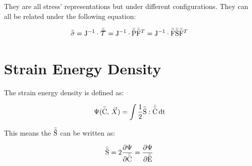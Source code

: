 They are all stress' representations but under different configurations. They can all be related under the following equation:

\begin{equation}
    \cauchy = \J^{-1} \cdot \kirchhoff = \J^{-1} \cdot \pkOne \F^T = \J^{-1} \cdot \F \pkTwo \F^T
\end{equation}

\section{Strain Energy Density}

The strain energy density is defined as:

\begin{equation}
    \Psi (\bar{\bar{\mathrm{C}}}, \, \vec{X}) = \int \frac{1}{2}\bar{\bar{\mathrm{S}}} : \dot{\bar{\bar{\mathrm{C}}}} \, \mathrm{dt} 
\end{equation}

This means the $\bar{\bar{\mathrm{S}}}$ can be written as:

\begin{equation}
    \bar{\bar{\mathrm{S}}} = 2 \frac{\partial \Psi}{\partial \bar{\bar{\mathrm{C}}}} = \frac{\partial \Psi}{\partial \bar{\bar{\mathrm{E}}}}
\end{equation}
